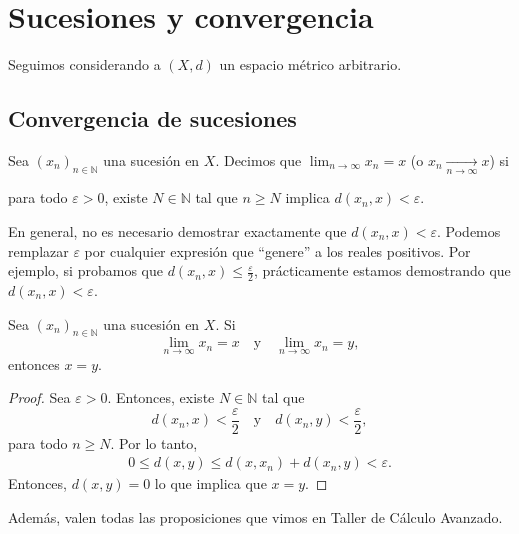 \chapter{Sucesiones y convergencia}

Seguimos considerando a $(X, d)$ un espacio métrico arbitrario.

\section{Convergencia de sucesiones}

\begin{definition}
	Sea $(x_n)_{n \in \mathbb{N}}$ una sucesión en $X$. Decimos que $\lim_{n \to \infty} x_{n} = x$ (o $x_{n} \xrightarrow[n \to \infty]{} x$) si
	\begin{center}
		\begin{minipage}{0.9\linewidth}
			para todo $\varepsilon > 0$, existe $N \in \mathbb{N}$ tal que $n \geq N$ implica $d(x_n, x) < \varepsilon$.
		\end{minipage}
	\end{center}
\end{definition}

\begin{remark}
	En general, no es necesario demostrar exactamente que $d(x_n, x) < \varepsilon$. Podemos remplazar $\varepsilon$ por cualquier expresión que ``genere'' a los reales positivos. Por ejemplo, si probamos que $d(x_n, x) \leq \frac{\varepsilon}{2}$, prácticamente estamos demostrando que $d(x_n, x) < \varepsilon$.
\end{remark}

\begin{proposition}
	Sea $(x_n)_{n \in \mathbb{N}}$ una sucesión en $X$. Si
	$$
		\lim_{n \to \infty} x_n = x \quad\text{y}\quad \lim_{n \to \infty} x_n = y,
	$$
	entonces $x = y$.
\end{proposition}


\begin{proof}
	Sea $\varepsilon > 0$. Entonces, existe $N \in \mathbb{N}$ tal que
	$$
		d(x_n, x) < \frac{\varepsilon}{2} \quad \text{y} \quad d(x_n, y) < \frac{\varepsilon}{2},
	$$
	para todo $n \geq N$. Por lo tanto,
	\begin{align*}
		0 \leq  d(x, y) \leq d(x, x_n) + d(x_n, y) < \varepsilon.
	\end{align*}
	Entonces, $d(x, y) = 0$ lo que implica que $x = y$.
\end{proof}

Además, valen todas las proposiciones que vimos en Taller de Cálculo Avanzado.

